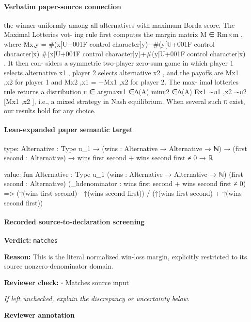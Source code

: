 \documentclass[10pt]{article}
\newcommand{\reviewerbox}{%
  \par\noindent\fbox{\parbox{0.96\linewidth}{\rule{0pt}{0.38in}}}\par
}
\newcommand{\reviewmatch}[1]{%
  \par\noindent\textbf{Reviewer check:} $\square$\; #1\par
  \noindent\emph{If left unchecked, explain the discrepancy or uncertainty below.}\par
}
\begin{document}
\paragraph{Verbatim paper-source connection}
\begin{ReviewVerbatim}
the winner uniformly among all alternatives with maximum Borda score. The Maximal Lotteries vot-
ing rule first computes the margin matrix M ∈ Rm×m , where Mx,y = #(x[U+001F control character]y)−#(y[U+001F control character]x)
                                                                          #(x[U+001F control character]y)+#(y[U+001F control character]x) . It then con-
siders a symmetric two-player zero-sum game in which player 1 selects alternative x1 , player 2 selects
alternative x2 , and the payoffs are Mx1 ,x2 for player 1 and Mx2 ,x1 = −Mx1 ,x2 for player 2. The max-
imal lotteries rule returns a distribution π ∈ argmaxπ1 ∈∆(A) minπ2 ∈∆(A) Ex1 ∼π1 ,x2 ∼π2 [Mx1 ,x2 ],
i.e., a mixed strategy in Nash equilibrium. When several such π exist, our results hold for any choice.
\end{ReviewVerbatim}



\paragraph{Lean-expanded paper semantic target}
\begin{ReviewVerbatim}
type:
{Alternative : Type u_1} →
  (wins : Alternative → Alternative → ℕ) → (first second : Alternative) → wins first second + wins second first ≠ 0 → ℝ

value:
fun {Alternative : Type u_1} (wins : Alternative → Alternative → ℕ) (first second : Alternative)
    (_hdenominator : wins first second + wins second first ≠ 0) =>
  (↑(wins first second) - ↑(wins second first)) / (↑(wins first second) + ↑(wins second first))
\end{ReviewVerbatim}


\paragraph{Recorded source-to-declaration screening}
\textbf{Verdict:} \texttt{matches}
\\
{\raggedright
\textbf{Reason:} This is the literal normalized win-\allowbreak{}loss margin, explicitly restricted to its source nonzero-\allowbreak{}denominator domain.\allowbreak{}
\par}
\reviewmatch{Matches source input}
\noindent\textbf{Reviewer annotation}\par
\reviewerbox
\clearpage
\hypertarget{paper-prerequisite-bbe7079711c4e442}{}
\end{document}
